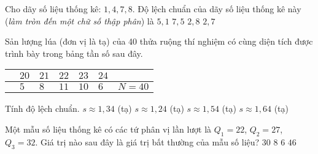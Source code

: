 \begin{ex}%
	Cho dãy số liệu thống kê: $1,4,7,8$. Độ lệch chuẩn của dãy số liệu thống kê này (\textit{làm tròn đến một chữ số thập phân}) là
	\choice
	{$5,1$}
	{$7,5$}
	{$2,8$}
	{\True $2,7$}
\end{ex}

\begin{ex}%
	Sản lượng lúa (đơn vị là tạ) của 40 thửa ruộng thí nghiệm có cùng diện tích được trình bày trong bảng tần số sau đây.
	\begin{center}
		\begin{tabular}{|>{\centering\arraybackslash}p{4cm}|>{\centering\arraybackslash}p{1.5cm}|>{\centering\arraybackslash}p{1.5cm}|>{\centering\arraybackslash}p{1.5cm}|>{\centering\arraybackslash}p{1.5cm}|>{\centering\arraybackslash}p{1.5cm}|>{\centering\arraybackslash}p{2cm}|}
			\hline  {\bf Sản lượng}&$20$  &$21$  &$22$  &$23$  &$24$  &  \\ 
			\hline  {\bf Số thửa ruộng}&$5$  &$8$  &$11$  &$10$  &$6$  & $N=40$  \\ 
			\hline 
		\end{tabular} 
	\end{center}
	Tính độ lệch chuẩn.
	\choice
	{$s\approx 1,34$ (tạ)}
	{\True $s\approx 1,24$ (tạ)}
	{$s\approx 1,54$ (tạ)}
	{$s\approx 1,64$ (tạ)}
\end{ex}

\begin{ex}%
	Một mẫu số liệu thống kê có các tứ phân vị lần lượt là $Q_1=22$, $Q_2= 27$, $Q_3= 32$. Giá trị nào sau đây là giá trị bất thường của mẫu số liệu?
	\choice
	{$30$}
	{$8$}
	{\True $6$}
	{$46$} 
\end{ex}


